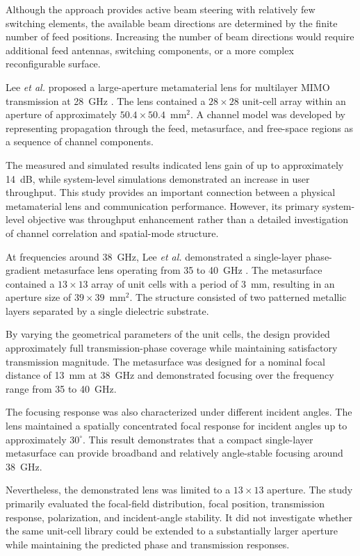 Although the approach provides active beam steering with relatively
few switching elements, the available beam directions are determined
by the finite number of feed positions. Increasing the number of beam
directions would require additional feed antennas, switching
components, or a more complex reconfigurable surface.

Lee \textit{et al.} proposed a large-aperture metamaterial lens for
multilayer MIMO transmission at 28~GHz
\cite{Lee2022Large}. The lens contained a $28\times28$
unit-cell array within an aperture of approximately
$50.4\times50.4$~mm$^2$. A channel model was developed by
representing propagation through the feed, metasurface, and
free-space regions as a sequence of channel components.

The measured and simulated results indicated lens gain of up to
approximately 14~dB, while system-level simulations demonstrated an
increase in user throughput. This study provides an important
connection between a physical metamaterial lens and communication
performance. However, its primary system-level objective was
throughput enhancement rather than a detailed investigation of
channel correlation and spatial-mode structure.

At frequencies around 38~GHz, Lee \textit{et al.} demonstrated a
single-layer phase-gradient metasurface lens operating from 35 to
40~GHz \cite{Lee2021}. The metasurface contained a
$13\times13$ array of unit cells with a period of 3~mm, resulting in
an aperture size of $39\times39$~mm$^2$. The structure consisted of
two patterned metallic layers separated by a single dielectric
substrate.

By varying the geometrical parameters of the unit cells, the design
provided approximately full transmission-phase coverage while
maintaining satisfactory transmission magnitude. The metasurface was
designed for a nominal focal distance of 13~mm at 38~GHz and
demonstrated focusing over the frequency range from 35 to 40~GHz.

The focusing response was also characterized under different incident
angles. The lens maintained a spatially concentrated focal response
for incident angles up to approximately $30^{\circ}$. This result
demonstrates that a compact single-layer metasurface can provide
broadband and relatively angle-stable focusing around 38~GHz.

Nevertheless, the demonstrated lens was limited to a
$13\times13$ aperture. The study primarily evaluated the focal-field
distribution, focal position, transmission response, polarization,
and incident-angle stability. It did not investigate whether the same
unit-cell library could be extended to a substantially larger
aperture while maintaining the predicted phase and transmission
responses.

